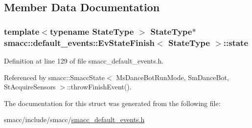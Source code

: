 \subsection{Member Data Documentation}
\subsubsection[{\texorpdfstring{state}{state}}]{\setlength{\rightskip}{0pt plus 5cm}template$<$typename State\+Type $>$ State\+Type$\ast$ {\bf smacc\+::default\+\_\+events\+::\+Ev\+State\+Finish}$<$ State\+Type $>$\+::state}\hypertarget{structsmacc_1_1default__events_1_1EvStateFinish_ad598cccf2b8ddb507f3c0efba2232d62}{}\label{structsmacc_1_1default__events_1_1EvStateFinish_ad598cccf2b8ddb507f3c0efba2232d62}


Definition at line 129 of file smacc\+\_\+default\+\_\+events.\+h.



Referenced by smacc\+::\+Smacc\+State$<$ Ms\+Dance\+Bot\+Run\+Mode, Sm\+Dance\+Bot, St\+Acquire\+Sensors $>$\+::throw\+Finish\+Event().



The documentation for this struct was generated from the following file\+:\begin{DoxyCompactItemize}
\item 
smacc/include/smacc/\hyperlink{smacc__default__events_8h}{smacc\+\_\+default\+\_\+events.\+h}\end{DoxyCompactItemize}
